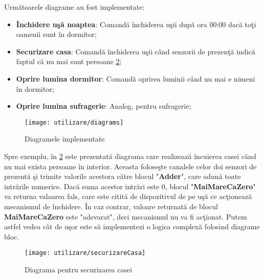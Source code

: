 Următoarele diagrame au fost implementate:
\begin{itemize}
	\item \textbf{Închidere uşă noaptea}: Comandă închiderea uşii după ora 00:00 dacă toţi oamenii sunt în dormitor;
	\item \textbf{Securizare casa}:  Comandă închiderea uşii când senzorii de prezenţă indică faptul că nu mai sunt persoane \ref{fig:securizareCasa};
	\item \textbf{Oprire lumina dormitor}:  Comandă oprirea luminii când nu mai e nimeni în dormitor;
	\item \textbf{Oprire lumina sufragerie}: Analog, pentru sufragerie;
\end{itemize}

\begin{figure}[H]
	\centering
	\texttt{[image: utilizare/diagrams]}
	\captionsetup{justification=centering}
	\caption{Diagramele implementate}
	\label{fig:diagrams}
\end{figure}
Spre exemplu, în \cref{fig:securizareCasa} este prezentată diagrama care realizează încuierea casei când nu mai exista persoane în interior. Aceasta foloseşte canalele celor doi senzori de prezentă şi trimite valorile acestora către blocul "\textbf{Adder}", care adună toate intrările numerice. Dacă suma acestor intrări este 0, blocul "\textbf{MaiMareCaZero}" va returna valoarea fals, care este citită de dispozitivul de pe uşă ce acţionează mecanismul de închidere. În caz contrar, valoare returnată de blocul \textbf{MaiMareCaZero} este "adevarat", deci mecanismul nu va fi acţionat. Putem astfel vedea cât de uşor este să implementezi o logica complexă folosind diagrame bloc.
\begin{figure}[H]
	\centering
	\texttt{[image: utilizare/securizareCasa]}
	\captionsetup{justification=centering}
	\caption{Diagrama pentru securizarea casei}
	\label{fig:securizareCasa}
\end{figure}